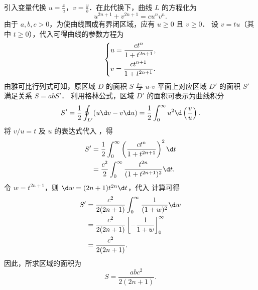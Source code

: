 \begin{solution}
    引入变量代换 $u = \frac{x}{a}$，$v = \frac{y}{b}$．在此代换下，曲线 $L$ 的方程化为
    \begin{equation}
        \label{eq:curve-uv}
        u^{2n+1} + v^{2n+1} = c u^n v^n.
    \end{equation}
    由于 $a, b, c > 0$，为使曲线围成有界闭区域，应有 $u \ge 0$ 且 $v \ge 0$．
    设 $v = t u$（其中 $t \ge 0$），代入可得曲线的参数方程为
    \begin{equation}
        \label{eq:param-uv}
        \begin{dcases}
            u = \frac{c t^n}{1 + t^{2n+1}}, \\
            v = \frac{c t^{n+1}}{1 + t^{2n+1}}.
        \end{dcases}
    \end{equation}
    由雅可比行列式可知，原区域 $D$ 的面积 $S$ 与 $u\text{-}v$ 平面上对应区域 $D'$ 的面积 $S'$ 满足关系 $S = ab S'$．
    利用格林公式，区域 $D'$ 的面积可表示为曲线积分
    \begin{equation}
        \label{eq:green-area}
        S' = \frac{1}{2} \oint_{L'} (u \d v - v \d u) = \frac{1}{2} \int_{0}^{\infty} u^2 \d \left(\frac{v}{u}\right).
    \end{equation}
    将 $v/u = t$ 及 $u$ 的表达式代入 ，得
    \begin{equation}
        \label{eq:integral-uv}
        \begin{aligned}
            S' & = \frac{1}{2} \int_{0}^{\infty} \left( \frac{c t^n}{1 + t^{2n+1}} \right)^2 \d t \\
               & = \frac{c^2}{2} \int_{0}^{\infty} \frac{t^{2n}}{(1 + t^{2n+1})^2} \d t.
        \end{aligned}
    \end{equation}
    令 $w = t^{2n+1}$，则 $\d w = (2n+1) t^{2n} \d t$，代入  计算可得
    \begin{equation}
        \label{eq:result-s-prime}
        \begin{aligned}
            S' & = \frac{c^2}{2(2n+1)} \int_{0}^{\infty} \frac{1}{(1 + w)^2} \d w   \\
               & = \frac{c^2}{2(2n+1)} \left[ -\frac{1}{1 + w} \right]_{0}^{\infty} \\
               & = \frac{c^2}{2(2n+1)}.
        \end{aligned}
    \end{equation}
    因此，所求区域的面积为
    \begin{equation}
        S = \boxed{\frac{abc^2}{2(2n+1)}}.
    \end{equation}
\end{solution}

